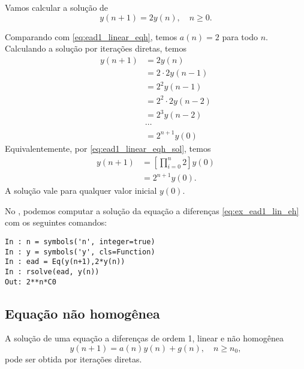 \begin{ex}
  Vamos calcular a solução de
  \begin{equation}\label{eq:ex_ead1_lin_eh}
    y(n+1) = 2y(n),\quad n\geq 0.
  \end{equation}

  Comparando com \eqref{eq:ead1_linear_eqh}, temos $a(n) = 2$ para todo $n$. Calculando a solução por iterações diretas, temos
  \begin{align}
    y(n+1) &= 2y(n) \\
            &= 2\cdot 2y(n-1) \\
            &= 2^2y(n-1) \\
            &= 2^2\cdot 2y(n-2) \\
            &= 2^3y(n-2) \\
            &\cdots \\
            &= 2^{n+1}y(0)
  \end{align}
  Equivalentemente, por \eqref{eq:ead1_linear_eqh_sol}, temos
  \begin{align}
    y(n+1) &= \left[\prod_{i=0}^{n}2\right]y(0) \\
            &= 2^{n+1}y(0).
  \end{align}
  A solução vale para qualquer valor inicial $y(0)$.

  \ifispython
  No \python, podemos computar a solução da equação a diferenças \eqref{eq:ex_ead1_lin_eh} com os seguintes comandos:
\begin{verbatim}
In : n = symbols('n', integer=true)
In : y = symbols('y', cls=Function)
In : ead = Eq(y(n+1),2*y(n))
In : rsolve(ead, y(n))
Out: 2**n*C0
\end{verbatim}
  \fi
\end{ex}

\subsection{Equação não homogênea}

A solução de uma equação a diferenças de ordem 1, linear e não homogênea
\begin{equation}\label{eq:ead1_linear_eqh}
  y(n+1) = a(n)y(n) + g(n),\quad n\geq n_0,
\end{equation}
pode ser obtida por iterações diretas.

